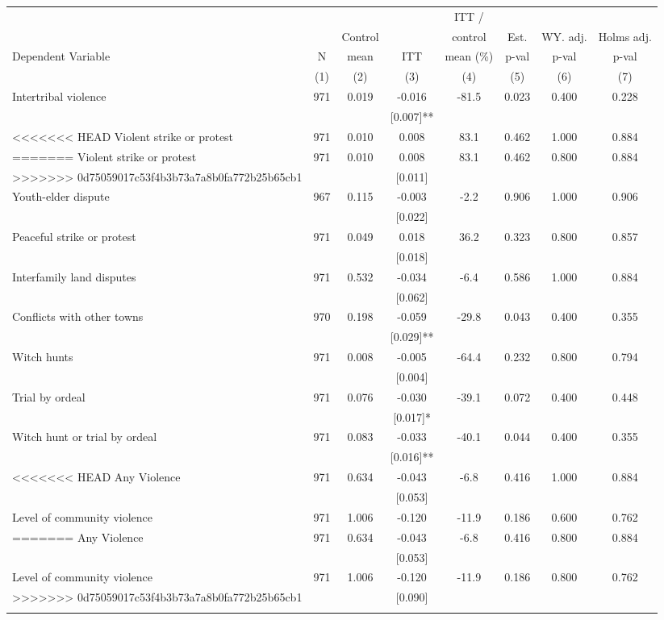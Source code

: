 \begin{tabular}{lccccccc}
\hline \noalign{\smallskip} &  &  &  & ITT / &  &  & \\
 &  & Control &  & control & Est. & WY. adj. & Holms adj.\\
Dependent Variable & N & mean & ITT & mean (\%) & p-val & p-val & p-val\\
 & (1) & (2) & (3) & (4) & (5) & (6) & (7)\\
\noalign{\smallskip}\hline \noalign{\smallskip}\quad Intertribal violence & 971 & 0.019 & -0.016 & -81.5 & 0.023 & 0.400 & 0.228\\
 &  &  & [0.007]** &  &  &  & \\
<<<<<<< HEAD
\quad Violent strike or protest & 971 & 0.010 & 0.008 & 83.1 & 0.462 & 1.000 & 0.884\\
=======
\quad Violent strike or protest & 971 & 0.010 & 0.008 & 83.1 & 0.462 & 0.800 & 0.884\\
>>>>>>> 0d75059017c53f4b3b73a7a8b0fa772b25b65cb1
 &  &  & [0.011] &  &  &  & \\
\quad Youth-elder dispute & 967 & 0.115 & -0.003 & -2.2 & 0.906 & 1.000 & 0.906\\
 &  &  & [0.022] &  &  &  & \\
\quad Peaceful strike or protest & 971 & 0.049 & 0.018 & 36.2 & 0.323 & 0.800 & 0.857\\
 &  &  & [0.018] &  &  &  & \\
\quad Interfamily land disputes & 971 & 0.532 & -0.034 & -6.4 & 0.586 & 1.000 & 0.884\\
 &  &  & [0.062] &  &  &  & \\
\quad Conflicts with other towns & 970 & 0.198 & -0.059 & -29.8 & 0.043 & 0.400 & 0.355\\
 &  &  & [0.029]** &  &  &  & \\
\quad Witch hunts & 971 & 0.008 & -0.005 & -64.4 & 0.232 & 0.800 & 0.794\\
 &  &  & [0.004] &  &  &  & \\
\quad Trial by ordeal & 971 & 0.076 & -0.030 & -39.1 & 0.072 & 0.400 & 0.448\\
 &  &  & [0.017]* &  &  &  & \\
\quad Witch hunt or trial by ordeal & 971 & 0.083 & -0.033 & -40.1 & 0.044 & 0.400 & 0.355\\
 &  &  & [0.016]** &  &  &  & \\
<<<<<<< HEAD
Any Violence & 971 & 0.634 & -0.043 & -6.8 & 0.416 & 1.000 & 0.884\\
 &  &  & [0.053] &  &  &  & \\
Level of community violence & 971 & 1.006 & -0.120 & -11.9 & 0.186 & 0.600 & 0.762\\
=======
Any Violence & 971 & 0.634 & -0.043 & -6.8 & 0.416 & 0.800 & 0.884\\
 &  &  & [0.053] &  &  &  & \\
Level of community violence & 971 & 1.006 & -0.120 & -11.9 & 0.186 & 0.800 & 0.762\\
>>>>>>> 0d75059017c53f4b3b73a7a8b0fa772b25b65cb1
 &  &  & [0.090] &  &  &  & \\
\noalign{\smallskip}\hline\end{tabular}
